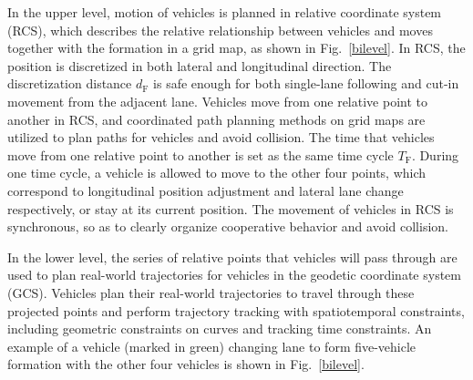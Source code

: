 \documentclass[journal]{IEEEtranTIE}
\begin{document}
In the upper level, motion of vehicles is planned in relative coordinate system (RCS), which describes the relative relationship between vehicles and moves together with the formation in a grid map, as shown in Fig.~\ref{bilevel}. In RCS, the position is discretized in both lateral and longitudinal direction. The discretization distance $d_\text{F}$ is safe enough for both single-lane following and cut-in movement from the adjacent lane. Vehicles move from one relative point to another in RCS, and coordinated path planning methods on grid maps are utilized to plan paths for vehicles and avoid collision. The time that vehicles move from one relative point to another is set as the same time cycle $T_\text{F}$. During one time cycle, a vehicle is allowed to move to the other four points, which correspond to longitudinal position adjustment and lateral lane change respectively, or stay at its current position. The movement of vehicles in RCS is synchronous, so as to clearly organize cooperative behavior and avoid collision.

In the lower level, the series of relative points that vehicles will pass through are used to plan real-world trajectories for vehicles in the geodetic coordinate system (GCS). Vehicles plan their real-world trajectories to travel through these projected points and perform trajectory tracking with spatiotemporal constraints, including geometric constraints on curves and tracking time constraints. An example of a vehicle (marked in green) changing lane to form five-vehicle formation with the other four vehicles is shown in Fig.~\ref{bilevel}.
\end{document}

